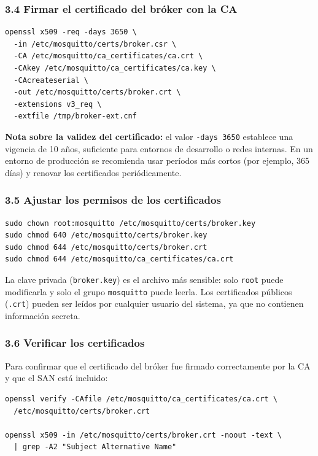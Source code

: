 \documentclass[12pt,a4paper]{article}
\begin{document}
\subsubsection{3.4 Firmar el certificado del bróker con la CA}

\begin{lstlisting}[style=bash]
openssl x509 -req -days 3650 \
  -in /etc/mosquitto/certs/broker.csr \
  -CA /etc/mosquitto/ca_certificates/ca.crt \
  -CAkey /etc/mosquitto/ca_certificates/ca.key \
  -CAcreateserial \
  -out /etc/mosquitto/certs/broker.crt \
  -extensions v3_req \
  -extfile /tmp/broker-ext.cnf
\end{lstlisting}

\textbf{Nota sobre la validez del certificado:} el valor \texttt{-days 3650}
establece una vigencia de 10 años, suficiente para entornos de desarrollo o
redes internas. En un entorno de producción se recomienda usar períodos más
cortos (por ejemplo, 365 días) y renovar los certificados periódicamente.

\subsubsection{3.5 Ajustar los permisos de los certificados}

\begin{lstlisting}[style=bash]
sudo chown root:mosquitto /etc/mosquitto/certs/broker.key
sudo chmod 640 /etc/mosquitto/certs/broker.key
sudo chmod 644 /etc/mosquitto/certs/broker.crt
sudo chmod 644 /etc/mosquitto/ca_certificates/ca.crt
\end{lstlisting}

La clave privada (\texttt{broker.key}) es el archivo más sensible: solo
\texttt{root} puede modificarla y solo el grupo \texttt{mosquitto} puede
leerla. Los certificados públicos (\texttt{.crt}) pueden ser leídos por
cualquier usuario del sistema, ya que no contienen información secreta.

\subsubsection{3.6 Verificar los certificados}

Para confirmar que el certificado del bróker fue firmado correctamente por la
CA y que el SAN está incluido:

\begin{lstlisting}[style=bash]
openssl verify -CAfile /etc/mosquitto/ca_certificates/ca.crt \
  /etc/mosquitto/certs/broker.crt

openssl x509 -in /etc/mosquitto/certs/broker.crt -noout -text \
  | grep -A2 "Subject Alternative Name"
\end{lstlisting}
\end{document}
